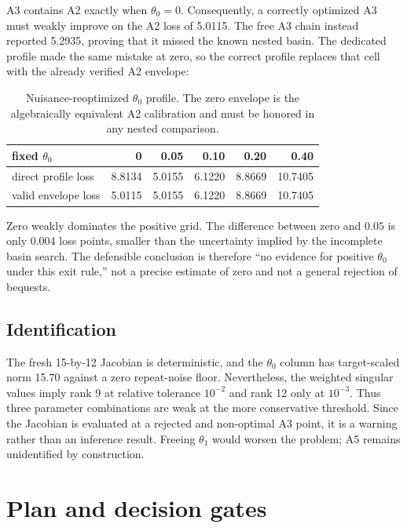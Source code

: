 \documentclass[10pt]{article}
\begin{document}
A3 contains A2 exactly when $\theta_0=0$. Consequently, a correctly optimized
A3 must weakly improve on the A2 loss of 5.0115. The free A3 chain instead
reported 5.2935, proving that it missed the known nested basin. The dedicated
profile made the same mistake at zero, so the correct profile replaces that
cell with the already verified A2 envelope:

\begin{table}[ht]
\centering
\small
\begin{tabular}{lrrrrr}
\toprule
fixed $\theta_0$ & 0 & 0.05 & 0.10 & 0.20 & 0.40 \\
\midrule
direct profile loss & 8.8134 & 5.0155 & 6.1220 & 8.8669 & 10.7405 \\
valid envelope loss & 5.0115 & 5.0155 & 6.1220 & 8.8669 & 10.7405 \\
\bottomrule
\end{tabular}
\caption{Nuisance-reoptimized $\theta_0$ profile. The zero envelope is the
algebraically equivalent A2 calibration and must be honored in any nested
comparison.}
\label{tab:profile}
\end{table}

Zero weakly dominates the positive grid. The difference between zero and
$0.05$ is only 0.004 loss points, smaller than the uncertainty implied by the
incomplete basin search. The defensible conclusion is therefore ``no evidence
for positive $\theta_0$ under this exit rule,'' not a precise estimate of zero
and not a general rejection of bequests.

\subsection{Identification}

The fresh 15-by-12 Jacobian is deterministic, and the $\theta_0$ column has
target-scaled norm 15.70 against a zero repeat-noise floor. Nevertheless, the
weighted singular values imply rank 9 at relative tolerance $10^{-2}$ and rank
12 only at $10^{-3}$. Thus three parameter combinations are weak at the more
conservative threshold. Since the Jacobian is evaluated at a rejected and
non-optimal A3 point, it is a warning rather than an inference result. Freeing
$\theta_1$ would worsen the problem; A5 remains unidentified by construction.

\section{Plan and decision gates}
\end{document}
